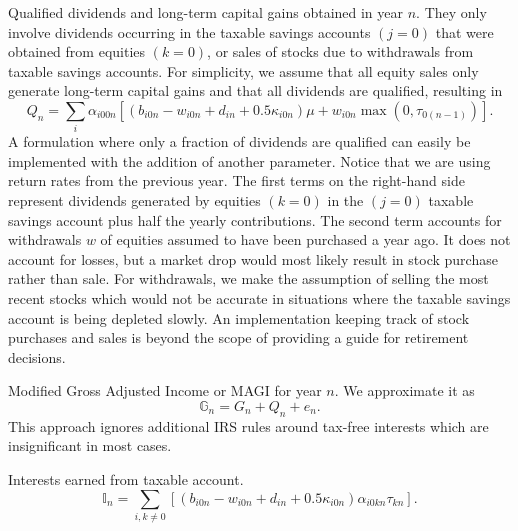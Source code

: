 \documentclass{report}[fleqn,12pt]
\begin{document}
\begin{description}[leftmargin=4em,style=multiline]
\item [$Q_n$]
	Qualified dividends and long-term capital gains obtained in year $n$.
	They only involve dividends occurring in the taxable savings accounts $(j=0)$ that
	were obtained from equities $(k=0)$, or sales of stocks due to withdrawals
	from taxable savings accounts.
	For simplicity, we assume that all equity sales only generate long-term capital gains and
	that all dividends are qualified, resulting in
	\begin{equation}
		\label{Eq:Qx2}
		Q_n = \sum_i \alpha_{i00n}\left[(b_{i0n} - w_{i0n} + d_{in} + 0.5\kappa_{i0n})\mu +
		w_{i0n}{\max(0, \tau_{0(n-1)})}\right].
	\end{equation}
	A formulation where only a fraction of dividends are qualified can easily be
	implemented with the addition of another parameter.
	Notice that we are using return rates from the previous year.
	The first terms on the right-hand side represent dividends generated by
        equities $(k=0)$ in the $(j=0)$ taxable savings account plus
	half the yearly contributions. The second term accounts for withdrawals $w$
        of equities assumed to have been purchased a year ago. 
	It does not account for losses, but a market drop
	would most likely result in stock purchase rather than sale.
	For withdrawals, we make the assumption of
	selling the most recent stocks which would not be accurate in situations where
	the taxable savings account is being depleted slowly. An implementation keeping track
	of stock purchases and sales is beyond the scope of providing a guide for retirement decisions.

\item [$\mathbb{G}_n$]
	Modified Gross Adjusted Income or MAGI for year $n$. We approximate it as
	\begin{equation}
		\mathbb{G}_n = G_n + Q_n + e_n.
	\end{equation}
	This approach ignores additional IRS
	rules around tax-free interests which are insignificant in most cases.

\item [$\mathbb{I}_n$]
	Interests earned from taxable account.
	\begin{equation}
		\mathbb{I}_n = \sum_{i,k\neq 0} [(b_{i0n} - w_{i0n} + d_{in}
		     + 0.5\kappa_{i0n})\alpha_{i0kn}\tau_{kn}].
	\end{equation}


\end{description}
\end{document}
